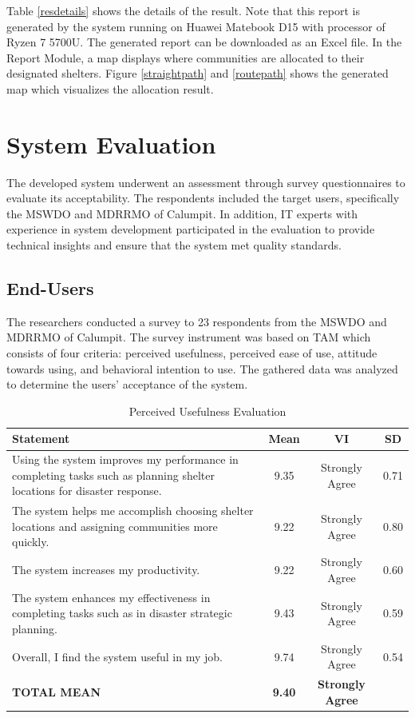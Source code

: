 	 Table \ref{resdetails} shows the details of the result. Note that this report is generated by the system running on Huawei Matebook D15 with processor of Ryzen 7 5700U. The generated report can be downloaded as an Excel file. In the Report Module, a map displays where communities are allocated to their designated shelters. Figure \ref{straightpath} and \ref{routepath} shows the generated map which visualizes the allocation result.
	
\section{System Evaluation}
	The developed system underwent an assessment through survey questionnaires to evaluate its acceptability. The respondents included the target users, specifically the MSWDO and MDRRMO of Calumpit. In addition, IT experts with experience in system development participated in the evaluation to provide technical insights and ensure that the system met quality standards.

\subsection{End-Users}
	The researchers conducted a survey to 23 respondents from the MSWDO and MDRRMO of Calumpit. The survey instrument was based on TAM which consists of four criteria: perceived usefulness, perceived ease of use, attitude towards using, and behavioral intention to use. The gathered data was analyzed to determine the users’ acceptance of the system. 

	\begin{table}[h!]
		\centering
		\caption{Perceived Usefulness Evaluation}
		\label{percuse}
		\renewcommand{\arraystretch}{1.2}
		\begin{tabularx}{\linewidth}{|X|c|c|c|}
			\hline
			\textbf{Statement} & \textbf{Mean} & \textbf{VI} & \textbf{SD} \\ \hline
			Using the system improves my performance in completing tasks such as planning shelter locations for disaster response.
			& 9.35 & Strongly Agree & 0.71 \\ \hline
			The system helps me accomplish choosing shelter locations and assigning communities more quickly.
			& 9.22 & Strongly Agree & 0.80 \\ \hline
			The system increases my productivity.
			& 9.22 & Strongly Agree & 0.60 \\ \hline
			The system enhances my effectiveness in completing tasks such as in disaster strategic planning.
			& 9.43 & Strongly Agree & 0.59 \\ \hline
			Overall, I find the system useful in my job.
			& 9.74 & Strongly Agree & 0.54 \\ \hline
			\textbf{TOTAL MEAN} & \textbf{9.40} & \textbf{Strongly Agree} & \\ \hline
		\end{tabularx}
	\end{table}
	
